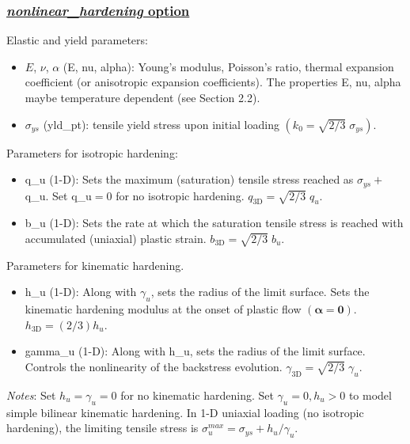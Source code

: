 \documentclass[11pt]{report}
\numberwithin{equation}{section}
\newcommand{\bmf } {\boldsymbol }
\newcommand{\bsf } [1]{\textrm{\textit{#1}}\xspace}
\begin{document}
\subsubsection{\underline{\bsf{nonlinear\_hardening} option}}

\noindent Elastic and yield parameters:
\begin {itemize}
\item $E$, $\nu$, $\alpha$ (E, nu, alpha): Young's modulus, Poisson's ratio, thermal expansion coefficient
(or anisotropic expansion coefficients). The properties E, nu, alpha maybe temperature 
dependent (see Section 2.2).
\item $\sigma_{ys}$ (yld\_pt): tensile yield stress upon initial loading 
$( k_0= \sqrt{2/3} \; \sigma_{ys})$.
\end{itemize}

\noindent Parameters for isotropic hardening:
\begin {itemize}
\item q\_u (1-D): Sets the maximum (saturation) tensile stress reached as
$\sigma_{ys} +$ q\_u. Set q\_u$= 0$ for 
no isotropic hardening. $q_{\textrm{3D}}= \sqrt{2/3}\;q_u$.
\item b\_u (1-D): Sets the rate at which the saturation tensile stress 
is reached with accumulated (uniaxial) plastic strain. $b_{\textrm{3D}} =
\sqrt{2/3}\;b_u$.
\end{itemize}

\noindent Parameters for kinematic hardening. 
\begin{itemize}
\item h\_u (1-D): Along with $\gamma_u$, sets the radius of the limit surface. Sets 
the kinematic hardening modulus at the onset of plastic flow 
$(\bmf{\alpha} = \bmf{0})$. $h_{\textrm{3D}} = (2/3) h_u$.
\item gamma\_u (1-D): Along with h\_u, sets the radius 
of the limit surface. Controls the nonlinearity of the backstress evolution.
$\gamma_{\textrm{3D}} = \sqrt{2/3}\;\gamma_u$.
\end{itemize}

\setlength{\hangindent}{0.75in}
\textit{Notes}: Set $h_u = \gamma_u = 0$  for no kinematic hardening. Set 
$\gamma_u = 0, h_u > 0$ to model simple bilinear kinematic hardening.
In 1-D uniaxial loading (no isotropic hardening), the limiting tensile stress is
$\sigma_u^{max} = \sigma_{ys} + h_u / \gamma_u$.
\end{document}
